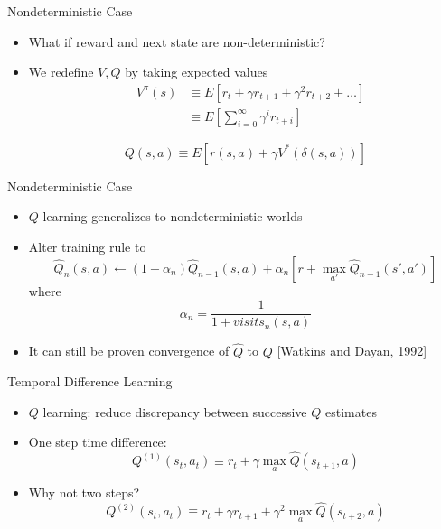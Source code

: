 \documentclass[%
pdf,
colorBG,
slideColor,
tcrico,
]{prosper}
\begin{document}


\begin{slide}{Nondeterministic Case } 

\begin{itemize}
 \item What if reward and next state are non-deterministic?
\item  We redefine $V, Q$ by taking expected values
 \begin{eqnarray}
 & V^{\pi}(s) & \equiv E[ r_{t} + \gamma r_{t+1} + \gamma^{2} r_{t+2} + \ldots ]
\nonumber \\ 
& & \equiv E [ \sum_{i=0}^{\infty} \gamma^{i} r_{t+i} ] \nonumber
\end{eqnarray}

\[ Q(s,a) \equiv E[r(s,a) + \gamma V^{*}(\delta(s,a)) ] \]
\end{itemize}
\end{slide}


\begin{slide}{Nondeterministic Case } 
\begin{itemize}
 \item  $Q$ learning generalizes to nondeterministic worlds
\item  Alter training rule to
\[ \hat{Q}_{n}(s,a)  \leftarrow  (1-\alpha_{n})\hat{Q}_{n-1}(s,a) + \alpha_{n}[r
+ \max_{a'}\hat{Q}_{n-1}(s',a')] \]
where
\[ \alpha_{n} = \frac{1}{1 + visits_n(s,a)} \]
\item  It can still be proven convergence of $\hat{Q}$ to $Q$ [Watkins and Dayan, 1992]
\end{itemize}
\end{slide}


\begin{slide}{Temporal Difference Learning } 

\begin{itemize}
 \item  $Q$ learning: reduce discrepancy between successive $Q$ estimates
\item One step time difference:
\[ Q^{(1)}(s_t,a_t) \equiv r_t + \gamma \max_{a} \hat{Q}(s_{t+1},a) \]
\item  Why not two steps?
\[ Q^{(2)}(s_t,a_t) \equiv r_t + \gamma r_{t+1} + \gamma^2 \max_{a}
\hat{Q}(s_{t+2},a) \]
\end{itemize}
\end{slide}
\end{document}
